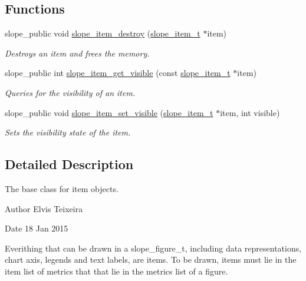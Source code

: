 \subsection*{Functions}
\begin{DoxyCompactItemize}
\item 
slope\+\_\+public void \hyperlink{group__Item_gaf048bd8c425893229133befa61831fd6}{slope\+\_\+item\+\_\+destroy} (\hyperlink{group__Item_ga2616141f0e164a876049da51ea3a8646}{slope\+\_\+item\+\_\+t} $\ast$item)
\begin{DoxyCompactList}\small\item\em Destroys an item and frees the memory. \end{DoxyCompactList}\item 
slope\+\_\+public int \hyperlink{group__Item_gaf9e09ab9591e1a2c3c41441f206ffd38}{slope\+\_\+item\+\_\+get\+\_\+visible} (const \hyperlink{group__Item_ga2616141f0e164a876049da51ea3a8646}{slope\+\_\+item\+\_\+t} $\ast$item)
\begin{DoxyCompactList}\small\item\em Queries for the visibility of an item. \end{DoxyCompactList}\item 
\hypertarget{group__Item_ga05e1944a09f330d4f9c0aa5e51181742}{slope\+\_\+public void \hyperlink{group__Item_ga05e1944a09f330d4f9c0aa5e51181742}{slope\+\_\+item\+\_\+set\+\_\+visible} (\hyperlink{group__Item_ga2616141f0e164a876049da51ea3a8646}{slope\+\_\+item\+\_\+t} $\ast$item, int visible)}\label{group__Item_ga05e1944a09f330d4f9c0aa5e51181742}

\begin{DoxyCompactList}\small\item\em Sets the visibility state of the item. \end{DoxyCompactList}\end{DoxyCompactItemize}


\subsection{Detailed Description}
The base class for item objects. 

\begin{DoxyAuthor}{Author}
Elvis Teixeira 
\end{DoxyAuthor}
\begin{DoxyDate}{Date}
18 Jan 2015
\end{DoxyDate}
Everithing that can be drawn in a slope\+\_\+figure\+\_\+t, including data representations, chart axis, legends and text labels, are items. To be drawn, items must lie in the item list of metrics that that lie in the metrics list of a figure. 

